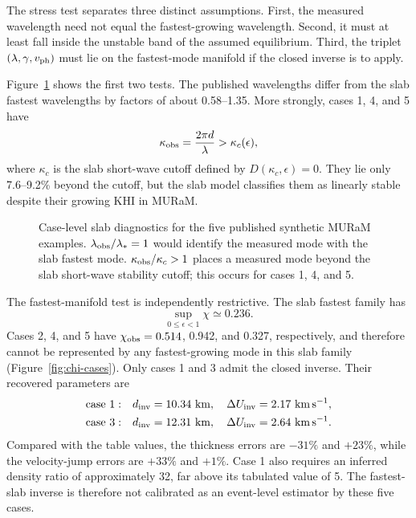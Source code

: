 \documentclass[linenumbers]{aastex7}
\begin{document}
The stress test separates three distinct assumptions. First, the measured wavelength need not equal the fastest-growing wavelength. Second, it must at least fall inside the unstable band of the assumed equilibrium. Third, the triplet $(\lambda,\gamma,v_{\rm ph})$ must lie on the fastest-mode manifold if the closed inverse is to apply.

Figure~\ref{fig:mode-location} shows the first two tests. The published wavelengths differ from the slab fastest wavelengths by factors of about 0.58--1.35. More strongly, cases 1, 4, and 5 have
\begin{equation}
\kappa_{\rm obs}=\frac{2\pi d}{\lambda}>\kappa_c(\epsilon),
\end{equation}
where $\kappa_c$ is the slab short-wave cutoff defined by $D(\kappa_c,\epsilon)=0$. They lie only 7.6--9.2\% beyond the cutoff, but the slab model classifies them as linearly stable despite their growing KHI in MURaM.

\begin{figure}
\caption{Case-level slab diagnostics for the five published synthetic MURaM examples. $\lambda_{\rm obs}/\lambda_\ast=1$ would identify the measured mode with the slab fastest mode. $\kappa_{\rm obs}/\kappa_c>1$ places a measured mode beyond the slab short-wave stability cutoff; this occurs for cases 1, 4, and 5.}
\label{fig:mode-location}
\end{figure}

The fastest-manifold test is independently restrictive. The slab fastest family has
\begin{equation}
\sup_{0\leq\epsilon<1}\chi\simeq0.236.
\end{equation}
Cases 2, 4, and 5 have $\chi_{\rm obs}=0.514$, 0.942, and 0.327, respectively, and therefore cannot be represented by any fastest-growing mode in this slab family (Figure~\ref{fig:chi-cases}). Only cases 1 and 3 admit the closed inverse. Their recovered parameters are
\begin{align}
{\rm case~1}:&\quad d_{\rm inv}=10.34~{\rm km},\quad
\Delta U_{\rm inv}=2.17~{\rm km\,s^{-1}},\\
{\rm case~3}:&\quad d_{\rm inv}=12.31~{\rm km},\quad
\Delta U_{\rm inv}=2.64~{\rm km\,s^{-1}}.
\end{align}
Compared with the table values, the thickness errors are $-31\%$ and $+23\%$, while the velocity-jump errors are $+33\%$ and $+1\%$. Case 1 also requires an inferred density ratio of approximately 32, far above its tabulated value of 5. The fastest-slab inverse is therefore not calibrated as an event-level estimator by these five cases.
\end{document}
